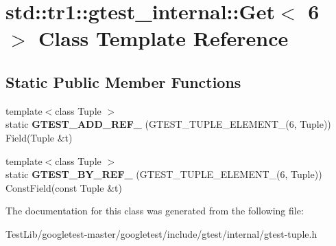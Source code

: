 \hypertarget{classstd_1_1tr1_1_1gtest__internal_1_1Get_3_016_01_4}{}\section{std\+:\+:tr1\+:\+:gtest\+\_\+internal\+:\+:Get$<$ 6 $>$ Class Template Reference}
\label{classstd_1_1tr1_1_1gtest__internal_1_1Get_3_016_01_4}
\subsection*{Static Public Member Functions}
\begin{DoxyCompactItemize}
\item 
\mbox{\label{classstd_1_1tr1_1_1gtest__internal_1_1Get_3_016_01_4_a28034152d066c8644fa55e9fc0e3a12d}} 
{\footnotesize template$<$class Tuple $>$ }\\static {\bfseries G\+T\+E\+S\+T\+\_\+\+A\+D\+D\+\_\+\+R\+E\+F\+\_\+} (G\+T\+E\+S\+T\+\_\+\+T\+U\+P\+L\+E\+\_\+\+E\+L\+E\+M\+E\+N\+T\+\_\+(6, Tuple)) Field(Tuple \&t)
\item 
\mbox{\label{classstd_1_1tr1_1_1gtest__internal_1_1Get_3_016_01_4_a6e396b998757e0ab9b75db0c68a7c360}} 
{\footnotesize template$<$class Tuple $>$ }\\static {\bfseries G\+T\+E\+S\+T\+\_\+\+B\+Y\+\_\+\+R\+E\+F\+\_\+} (G\+T\+E\+S\+T\+\_\+\+T\+U\+P\+L\+E\+\_\+\+E\+L\+E\+M\+E\+N\+T\+\_\+(6, Tuple)) Const\+Field(const Tuple \&t)
\end{DoxyCompactItemize}


The documentation for this class was generated from the following file\+:\begin{DoxyCompactItemize}
\item 
Test\+Lib/googletest-\/master/googletest/include/gtest/internal/gtest-\/tuple.\+h\end{DoxyCompactItemize}
